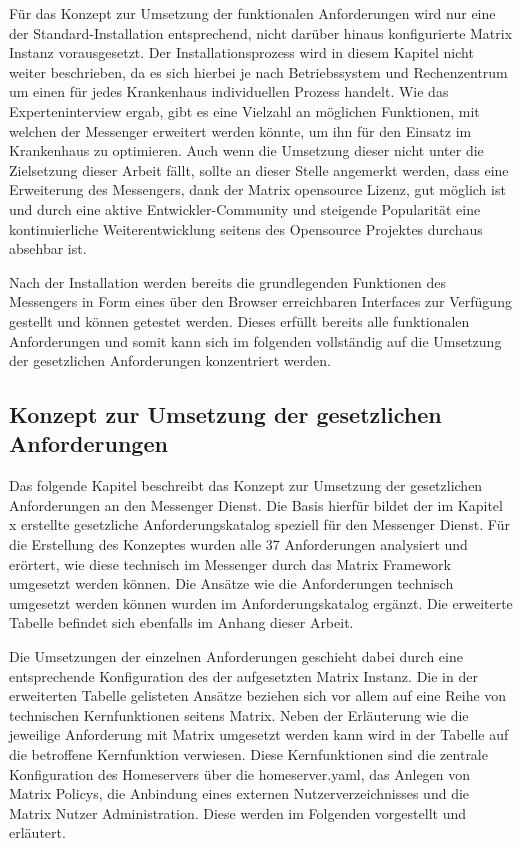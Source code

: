 Für das Konzept zur Umsetzung der funktionalen Anforderungen wird nur eine der Standard-Installation entsprechend, nicht darüber hinaus konfigurierte Matrix Instanz vorausgesetzt.
Der Installationsprozess wird in diesem Kapitel nicht weiter beschrieben, da es sich hierbei je nach Betriebssystem und Rechenzentrum um einen für jedes Krankenhaus individuellen Prozess handelt.
Wie das Experteninterview ergab, gibt es eine Vielzahl an möglichen Funktionen, mit welchen der Messenger erweitert werden könnte, um ihn für den Einsatz im Krankenhaus zu optimieren. Auch wenn die Umsetzung dieser nicht unter die Zielsetzung dieser Arbeit fällt, sollte an dieser Stelle angemerkt werden, dass eine Erweiterung des Messengers, dank der Matrix opensource Lizenz, gut möglich ist und durch eine aktive Entwickler-Community und steigende Popularität eine kontinuierliche Weiterentwicklung seitens des Opensource Projektes durchaus absehbar ist.

Nach der Installation werden bereits die grundlegenden Funktionen des Messengers in Form eines über den Browser erreichbaren Interfaces zur Verfügung gestellt und können getestet werden. Dieses erfüllt bereits alle funktionalen Anforderungen und somit kann sich im folgenden vollständig auf die Umsetzung der gesetzlichen Anforderungen konzentriert werden.

\subsection{Konzept zur Umsetzung der gesetzlichen Anforderungen}\label{chapter:vdmf}
Das folgende Kapitel beschreibt das Konzept zur Umsetzung der gesetzlichen Anforderungen an den Messenger Dienst.
Die Basis hierfür bildet der im Kapitel x erstellte gesetzliche Anforderungskatalog speziell für den Messenger Dienst. Für die Erstellung des Konzeptes wurden alle 37 Anforderungen analysiert und erörtert, wie diese technisch im Messenger durch das Matrix Framework umgesetzt werden können. Die Ansätze wie die Anforderungen technisch umgesetzt werden können wurden im Anforderungskatalog ergänzt. Die erweiterte Tabelle befindet sich ebenfalls im Anhang dieser Arbeit.

Die Umsetzungen der einzelnen Anforderungen geschieht dabei durch eine entsprechende Konfiguration des der aufgesetzten Matrix Instanz. Die in der erweiterten Tabelle gelisteten Ansätze beziehen sich vor allem auf eine Reihe von technischen Kernfunktionen seitens Matrix. Neben der Erläuterung wie die jeweilige Anforderung mit Matrix umgesetzt werden kann wird in der Tabelle auf die betroffene Kernfunktion verwiesen. Diese Kernfunktionen sind die zentrale Konfiguration des Homeservers über die homeserver.yaml, das Anlegen von Matrix Policys,
die Anbindung eines externen Nutzerverzeichnisses und die Matrix Nutzer Administration. Diese werden im Folgenden vorgestellt und erläutert.

